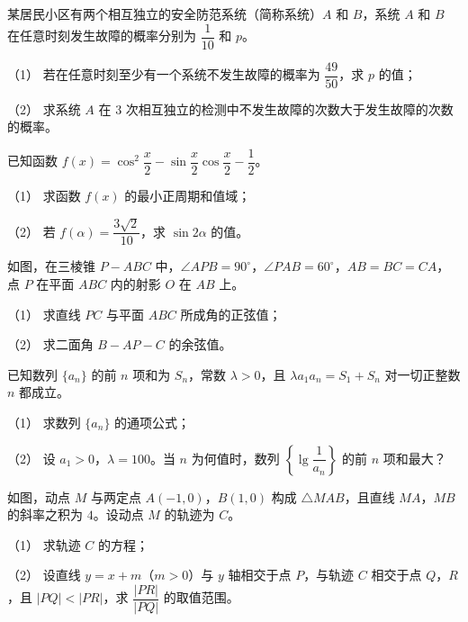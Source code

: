 \begin{question}
某居民小区有两个相互独立的安全防范系统（简称系统）$A$ 和 $B$，系统 $A$ 和 $B$ 在任意时刻发生故障的概率分别为 $\dfrac1{10}$ 和 $p$。

（1） 若在任意时刻至少有一个系统不发生故障的概率为 $\dfrac{49}{50}$，求 $p$ 的值；

（2） 求系统 $A$ 在 $3$ 次相互独立的检测中不发生故障的次数大于发生故障的次数的概率。

\end{question}
\begin{question}
已知函数 $f(x)=\cos^2\dfrac x2-\sin\dfrac x2\cos\dfrac x2-\dfrac12$。

（1） 求函数 $f(x)$ 的最小正周期和值域；

（2） 若 $f(\alpha)=\dfrac{3\sqrt2}{10}$，求 $\sin2\alpha$ 的值。

\Needspace{0.4\textheight}
\end{question}
\begin{question}
如图，在三棱锥 $P-ABC$ 中，$\angle APB=90^\circ$，$\angle PAB=60^\circ$，$AB=BC=CA$，点 $P$ 在平面 $ABC$ 内的射影 $O$ 在 $AB$ 上。

（1） 求直线 $PC$ 与平面 $ABC$ 所成角的正弦值；

（2） 求二面角 $B-AP-C$ 的余弦值。
\nopagebreak[4]
\begin{center}\end{center}
\nopagebreak[4]
\end{question}
\begin{question}
已知数列 $\{a_n\}$ 的前 $n$ 项和为 $S_n$，常数 $\lambda>0$，且 $\lambda a_1a_n=S_1+S_n$ 对一切正整数 $n$ 都成立。

（1） 求数列 $\{a_n\}$ 的通项公式；

（2） 设 $a_1>0$，$\lambda=100$。当 $n$ 为何值时，数列 $\left\{\lg\dfrac1{a_n}\right\}$ 的前 $n$ 项和最大？

\Needspace{0.4\textheight}
\end{question}
\begin{question}
如图，动点 $M$ 与两定点 $A(-1,0)$，$B(1,0)$ 构成 $\triangle MAB$，且直线 $MA$，$MB$ 的斜率之积为 $4$。设动点 $M$ 的轨迹为 $C$。

（1） 求轨迹 $C$ 的方程；

（2） 设直线 $y=x+m$（$m>0$）与 $y$ 轴相交于点 $P$，与轨迹 $C$ 相交于点 $Q$，$R$，且 $|PQ|<|PR|$，求 $\dfrac{|PR|}{|PQ|}$ 的取值范围。
\nopagebreak[4]
\begin{center}\end{center}
\nopagebreak[4]
\end{question}
